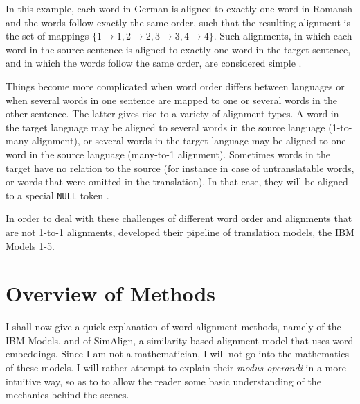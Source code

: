 In this example, each word in German is aligned to exactly one word in Romansh and the words follow exactly the same order, such that the resulting alignment is the set of mappings $\{1\to1, 2\to2,3\to3,4\to4\}$. 
Such alignments, in which each word in the source sentence is aligned to exactly one word in the target sentence, and in which the words follow the same order, are considered simple \autocite[85]{koehn2009}.

Things become more complicated when word order differs between languages or when several words in one sentence are mapped to one or several words in the other sentence. 
The latter gives rise to a variety of alignment types. 
A word in the target language may be aligned to several words in the source language (1-to-many alignment), or several words in the target language may be aligned to one word in the source language (many-to-1 alignment). 
Sometimes words in the target have no relation to the source (for instance in case of untranslatable words, or words that were omitted in the translation). 
In that case, they will be aligned to a special \texttt{NULL} token \autocite[85]{koehn2009}. 


In order to deal with these challenges of different word order and alignments that are not 1-to-1 alignments, \textcite{brown-etal-1993-mathematics} developed their pipeline of translation models, the IBM Models 1-5.

\section{Overview of Methods}
I shall now give a quick explanation of word alignment methods, namely of the IBM Models, and of SimAlign, a similarity-based alignment model that uses  word embeddings. 
Since I am not a mathematician, I will not go into the mathematics of these models. 
I will rather attempt to explain their \emph{modus operandi} in a more intuitive way, so as to to allow the reader some basic understanding of the mechanics behind the scenes.

